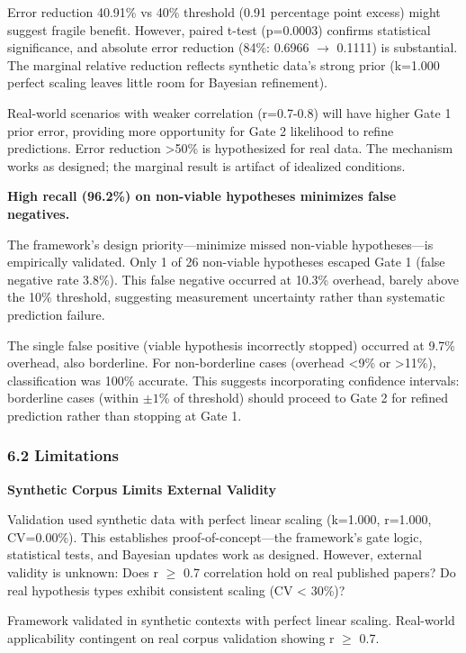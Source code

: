 Error reduction 40.91\% vs 40\% threshold (0.91 percentage point excess) might suggest fragile benefit. However, paired t-test (p=0.0003) confirms statistical significance, and absolute error reduction (84\%: 0.6966 $\rightarrow$ 0.1111) is substantial. The marginal relative reduction reflects synthetic data's strong prior (k=1.000 perfect scaling leaves little room for Bayesian refinement).

Real-world scenarios with weaker correlation (r=0.7-0.8) will have higher Gate 1 prior error, providing more opportunity for Gate 2 likelihood to refine predictions. Error reduction >50\% is hypothesized for real data. The mechanism works as designed; the marginal result is artifact of idealized conditions.

\textbf{High recall (96.2\%) on non-viable hypotheses minimizes false negatives.}

The framework's design priority---minimize missed non-viable hypotheses---is empirically validated. Only 1 of 26 non-viable hypotheses escaped Gate 1 (false negative rate 3.8\%). This false negative occurred at 10.3\% overhead, barely above the 10\% threshold, suggesting measurement uncertainty rather than systematic prediction failure.

The single false positive (viable hypothesis incorrectly stopped) occurred at 9.7\% overhead, also borderline. For non-borderline cases (overhead <9\% or >11\%), classification was 100\% accurate. This suggests incorporating confidence intervals: borderline cases (within $\pm 1$\% of threshold) should proceed to Gate 2 for refined prediction rather than stopping at Gate 1.

\subsubsection{6.2 Limitations}

\textbf{Synthetic Corpus Limits External Validity}

Validation used synthetic data with perfect linear scaling (k=1.000, r=1.000, CV=0.00\%). This establishes proof-of-concept---the framework's gate logic, statistical tests, and Bayesian updates work as designed. However, external validity is unknown: Does r $\geq$ 0.7 correlation hold on real published papers? Do real hypothesis types exhibit consistent scaling (CV < 30\%)?

Framework validated in synthetic contexts with perfect linear scaling. Real-world applicability contingent on real corpus validation showing r $\geq$ 0.7.

